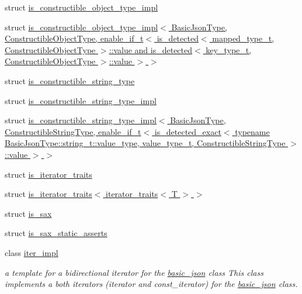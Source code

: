 \begin{DoxyCompactItemize}
\item 
struct \hyperlink{structnlohmann_1_1detail_1_1is__constructible__object__type__impl}{is\+\_\+constructible\+\_\+object\+\_\+type\+\_\+impl}
\item 
struct \hyperlink{structnlohmann_1_1detail_1_1is__constructible__object__type__impl_3_01BasicJsonType_00_01Construb7f96efbcfd2606ccb5c84a830a60036}{is\+\_\+constructible\+\_\+object\+\_\+type\+\_\+impl$<$ Basic\+Json\+Type, Constructible\+Object\+Type, enable\+\_\+if\+\_\+t$<$ is\+\_\+detected$<$ mapped\+\_\+type\+\_\+t, Constructible\+Object\+Type $>$\+::value and is\+\_\+detected$<$ key\+\_\+type\+\_\+t, Constructible\+Object\+Type $>$\+::value $>$ $>$}
\item 
struct \hyperlink{structnlohmann_1_1detail_1_1is__constructible__string__type}{is\+\_\+constructible\+\_\+string\+\_\+type}
\item 
struct \hyperlink{structnlohmann_1_1detail_1_1is__constructible__string__type__impl}{is\+\_\+constructible\+\_\+string\+\_\+type\+\_\+impl}
\item 
struct \hyperlink{structnlohmann_1_1detail_1_1is__constructible__string__type__impl_3_01BasicJsonType_00_01Construe4743afb22172cdb3c5f428800835387}{is\+\_\+constructible\+\_\+string\+\_\+type\+\_\+impl$<$ Basic\+Json\+Type, Constructible\+String\+Type, enable\+\_\+if\+\_\+t$<$ is\+\_\+detected\+\_\+exact$<$ typename Basic\+Json\+Type\+::string\+\_\+t\+::value\+\_\+type, value\+\_\+type\+\_\+t, Constructible\+String\+Type $>$\+::value $>$ $>$}
\item 
struct \hyperlink{structnlohmann_1_1detail_1_1is__iterator__traits}{is\+\_\+iterator\+\_\+traits}
\item 
struct \hyperlink{structnlohmann_1_1detail_1_1is__iterator__traits_3_01iterator__traits_3_01T_01_4_01_4}{is\+\_\+iterator\+\_\+traits$<$ iterator\+\_\+traits$<$ T $>$ $>$}
\item 
struct \hyperlink{structnlohmann_1_1detail_1_1is__sax}{is\+\_\+sax}
\item 
struct \hyperlink{structnlohmann_1_1detail_1_1is__sax__static__asserts}{is\+\_\+sax\+\_\+static\+\_\+asserts}
\item 
class \hyperlink{classnlohmann_1_1detail_1_1iter__impl}{iter\+\_\+impl}
\begin{DoxyCompactList}\small\item\em a template for a bidirectional iterator for the \hyperlink{classnlohmann_1_1basic__json}{basic\+\_\+json} class This class implements a both iterators (iterator and const\+\_\+iterator) for the \hyperlink{classnlohmann_1_1basic__json}{basic\+\_\+json} class. \end{DoxyCompactList}\item 

\end{DoxyCompactItemize}
